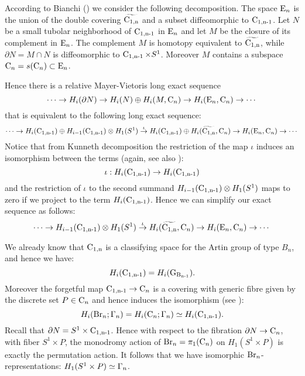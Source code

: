 According to Bianchi (\cite{bianchi}) we consider the following decomposition.
The space $\mathrm{E}_n$ is the union of the double covering $\widetilde{\operatorname{C_{1,n}}}$ and a subset diffeomorphic to $\operatorname{C_{1,n-1}}$. 
Let $N$ be a small tubolar neighborhood of $\operatorname{C_{1,n-1}}$ in $\mathrm{E}_n$ and let $M$ be the closure of its complement in $\mathrm{E}_n$. The complement $M$ is homotopy equivalent to $\widetilde{\operatorname{C_{1,n}}}$, while $\partial N = M \cap N$ is diffeomorphic to $\operatorname{C_{1,n-1}} \times S^1$. Moreover $M$ contains a subspace $\operatorname{C}_n = s(\operatorname{C}_n) \subset \mathrm{E}_n $. 




Hence there is a relative Mayer-Vietoris long exact sequence 
$$
\cdots \to H_i(\partial N) \to H_i (N) \oplus H_i(M, \operatorname{C}_n) \to H_i(\mathrm{E}_n, \operatorname{C}_n) \to \cdots
$$
that is equivalent to the following long exact sequence:
$$
\cdots \to H_i(\operatorname{C_{1,n-1}}) \oplus H_{i-1}(\operatorname{C_{1,n-1}}) \otimes H_1(S^1)\stackrel{\iota}{\to} H_i (\operatorname{C_{1,n-1}}) \oplus H_i(\widetilde{\operatorname{C_{1,n}}}, \operatorname{C}_n) \to H_i(\mathrm{E}_n, \operatorname{C}_n) \to \cdots
$$
Notice that from Kunneth decomposition the restriction of the map $\iota$ induces an isomorphism between the terms (again, see also \cite[Lem.~58]{bianchi}):
$$
\iota: H_i(\operatorname{C_{1,n-1}}) \to H_i(\operatorname{C_{1,n-1}})
$$
and the restriction of $\iota$ to the second summand $H_{i-1}(\operatorname{C_{1,n-1}}) \otimes H_1(S^1)$ maps to zero if we project to the term $H_i(\operatorname{C_{1,n-1}})$.
Hence we can simplify our exact sequence as follows:
\begin{equation}\label{eq:bia1}
\cdots \to  H_{i-1}(\operatorname{C_{1,n-1}}) \otimes H_1(S^1)\stackrel{\iota}{\to} H_i(\widetilde{\operatorname{C_{1,n}}}, \operatorname{C}_n) \to H_i(\mathrm{E}_n, \operatorname{C}_n) \to \cdots
\end{equation}



We already know that $\operatorname{C_{1,n}}$ is a classifying space for the Artin group of type $B_n$, and hence we have:
$$
H_i(\operatorname{C_{1,n-1}}) = H_i(\operatorname{G_{B_{n-1}}}).
$$
Moreover the forgetful map $\operatorname{C_{1,n-1}} \to \operatorname{C}_n$ is a covering with generic fibre given by the discrete set $P \in \operatorname{C}_n$ and hence induces the isomorphism (see \cite[Lem.~8]{bianchi}):
$$
H_i(\operatorname{Br}_{n}; \Gamma_n) = H_i(\operatorname{C}_{n}; \Gamma_n) \simeq H_i(\operatorname{C_{1,n-1}}).
$$
Recall that $\partial N = S^1 \times \operatorname{C_{1,n-1}}$. Hence with respect to the fibration $\partial N \to \operatorname{C}_n$, with fiber $S^1 \times P$, the monodromy action of $\operatorname{Br}_n = \pi_1(\operatorname{C}_n)$ on $H_1(S^1 \times P)$ is exactly the permutation action. It follows that we have isomorphic $\operatorname{Br}_n$-representations:
 $H_1(S^1 \times P) \simeq \Gamma_n$.

